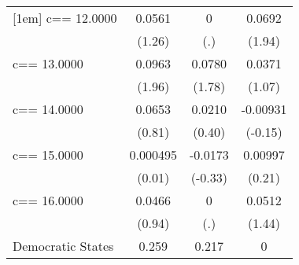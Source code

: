 \begin{tabular}{l*{3}{c}}
    [1em]
    c==    12.0000                & 0.0561                                              & 0                                                   & 0.0692                                              \\
                                  & (1.26)                                              & (.)                                                 & (1.94)                                              \\
    [1em]
    c==    13.0000                & 0.0963                                              & 0.0780                                              & 0.0371                                              \\
                                  & (1.96)                                              & (1.78)                                              & (1.07)                                              \\
    [1em]
    c==    14.0000                & 0.0653                                              & 0.0210                                              & -0.00931                                            \\
                                  & (0.81)                                              & (0.40)                                              & (-0.15)                                             \\
    [1em]
    c==    15.0000                & 0.000495                                            & -0.0173                                             & 0.00997                                             \\
                                  & (0.01)                                              & (-0.33)                                             & (0.21)                                              \\
    [1em]
    c==    16.0000                & 0.0466                                              & 0                                                   & 0.0512                                              \\
                                  & (0.94)                                              & (.)                                                 & (1.44)                                              \\
    [1em]
    Democratic States             & 0.259\sym{***}                                      & 0.217\sym{***}                                      & 0                                                   \\

\end{tabular}
